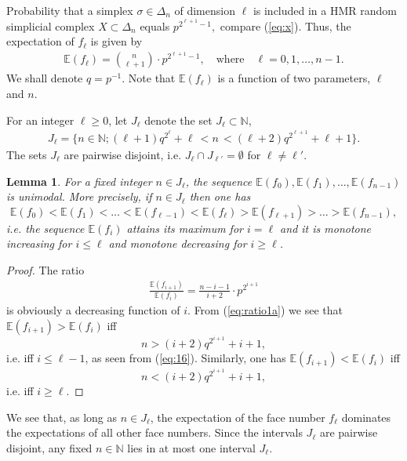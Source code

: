 \documentclass[10pt,a4paper]{amsart}
\newtheorem{lema}{Lemma}
\newtheorem{corollary}[lema]{Corollary}
\newcommand{\N}{\mathbb{N}}
\newcommand{\E}{\mathbb{E}}
\begin{document}
Probability that a simplex $\sigma\in \Delta_n$ of dimension $\ell$ is included in a HMR random simplicial complex $X\subset \Delta_n$ equals 
$
p^{2^{\ell+1}-1},
$
compare (\ref{eq:x}). Thus, the expectation of $f_\ell$ is given by 
\begin{eqnarray}\label{eq:expect}
\mathbb E(f_\ell) =\binom n {\ell+1} \cdot p^{2^{\ell+1}-1}, \quad \mbox{where}\quad \ell=0, 1, \dots, n-1.
\end{eqnarray}
We shall denote $q=p^{-1}.$ Note that $\E(f_\ell)$ is a function of two parameters, $\ell$ and $n$. 

For an integer $\ell\ge 0$, let $J_\ell$ denote the set $J_\ell\subset \N$,
\begin{eqnarray}\label{eq:16}
J_\ell =\{n\in \N; (\ell+1) q^{2^{\ell}}+\ell \, < n\,  <  (\ell+2) q^{2^{\ell+1}}+\ell+1\}.
\end{eqnarray}
The sets $J_\ell$ are pairwise disjoint, i.e. $J_\ell\cap J_{\ell'}=\emptyset$ for $\ell\not=\ell'$. 



\begin{lema}  \label{lm:14a}
For a fixed integer $n\in J_\ell$, the sequence $\E(f_0), \E(f_1), \dots, \E(f_{n-1})$ is unimodal. More precisely, if $n\in J_\ell$ then one has 
$$
\E(f_0)<\E(f_1)< \dots<\E(f_{\ell-1})<\E(f_{\ell})>\E(f_{\ell+1})>\dots >\E(f_{n-1}),
$$
i.e. the sequence $\E(f_i)$ attains its maximum for $i=\ell$ and it is monotone increasing for $i\le \ell$ and monotone decreasing for $i\ge \ell$. 
\end{lema} 
\begin{proof} The ratio
\begin{eqnarray}\label{eq:ratio1a}
 \frac{\mathbb E(f_{i+1})}{\mathbb E(f_{i})}= \frac{n-i-1}{i+2}\cdot p^{2^{i+1}}
\end{eqnarray}
is obviously a decreasing function of $i$. From (\ref{eq:ratio1a}) we see that $\E(f_{i+1})>\E(f_i)$ iff  
$$n>(i+2)q^{2^{i+1}}+i+1,$$ i.e. iff $i\le \ell-1$, as seen from 
(\ref{eq:16}). Similarly, one has $\E(f_{i+1})<\E(f_i)$ iff $$n<(i+2)q^{2^{i+1}}+i+1,$$ i.e. iff $i\ge \ell$. 
\end{proof}
We see that, as long as $n\in J_\ell$, the expectation of the face number $f_{\ell}$ dominates the expectations of all other face numbers. 
Since the intervals $J_\ell$ are pairwise disjoint, any fixed $n\in \N$ lies in at most one interval $J_\ell$. 
\end{document}
